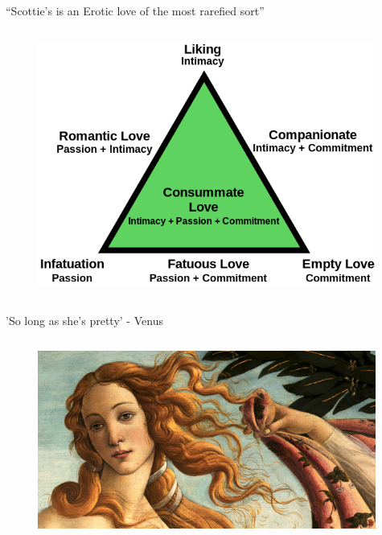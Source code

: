 \documentclass[xcolor=dvipsnames]{beamer}
\begin{document}
\begin{frame}[fragile]{``Scottie’s is an Erotic love of the most rarefied sort''}
  \begin{columns}[T] %
    \begin{column}{0.8\textwidth}
      \begin{figure}[H]
        \centering
        \includegraphics[width=0.99\textwidth]{love}
      \end{figure}
    \end{column}%
  \end{columns}
\end{frame}


\begin{frame}[fragile]{'So long as she's pretty' - Venus}
  \begin{columns}[T] %
    \begin{column}{0.9\textwidth}
      \begin{figure}[H]
        \centering
        \includegraphics[width=0.99\textwidth]{venus}
      \end{figure}
    \end{column}%
  \end{columns}
\end{frame}
\end{document}
